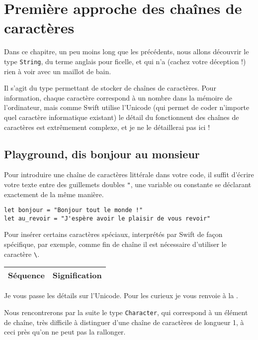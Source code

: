 \chapter{Première approche des chaînes de caractères}
Dans ce chapitre, un peu moins long que les précédents, nous allons découvrir le type \texttt{String}, du terme anglais pour ficelle, et qui n'a (cachez votre déception !) rien à voir avec un maillot de bain.

Il s'agit du type permettant de stocker de chaînes de caractères. Pour information, chaque caractère correspond à un nombre dans la mémoire de l'ordinateur, mais comme Swift utilise l'Unicode (qui permet de coder n'importe quel caractère informatique existant) le détail du fonctionnent des chaînes de caractères est extrêmement complexe, et je ne le détaillerai pas ici !
\section{Playground, dis bonjour au monsieur}
Pour introduire une chaîne de caractères littérale dans votre code, il suffit d'écrire votre texte entre des guillemets doubles \verb'"', une variable ou constante se déclarant exactement de la même manière.
\begin{listing}[h]
\begin{verbatim}
let bonjour = "Bonjour tout le monde !"
let au_revoir = "J'espère avoir le plaisir de vous revoir"
\end{verbatim}
\end{listing}

Pour insérer certains caractères spéciaux, interprétés par Swift de façon spécifique, par exemple, comme fin de chaîne il est nécessaire d'utiliser le caractère \verb"\".
\begin{longtabu} to \linewidth {|X[1,l,m]|X[4,l,m]|}
\hline
Séquence & Signification \\ \hline
\endhead

\end{longtabu}

Je vous passe les détails sur l'Unicode. Pour les curieux je vous renvoie à la .

Nous rencontrerons par la suite le type \texttt{Character}, qui correspond à un élément de chaîne, très difficile à distinguer d'une chaîne de caractères de longueur 1, à ceci près qu'on ne peut pas la rallonger.
